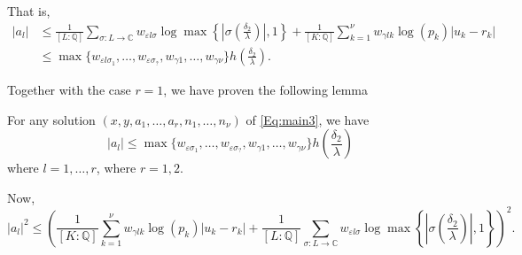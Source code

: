  That is, 
\begin{align*}
|a_l|	& \leq \frac{1}{[L:\mathbb{Q}]}\sum_{\sigma :L \to \mathbb{C}} w_{\varepsilon l \sigma}\log \max \left\{ \left|\sigma\left(\frac{\delta_2}{\lambda}\right)\right|, 1\right\} + \frac{1}{[K:\mathbb{Q}]}\sum_{k = 1}^{\nu} w_{\gamma l k}\log(p_k)|u_k - r_k|\\
	& \leq \max\{w_{\varepsilon l \sigma_1}, \dots, w_{\varepsilon \sigma_{?}}, w_{\gamma 1}, \dots, w_{\gamma \nu}\} h\left(\frac{\delta_2}{\lambda}\right).
\end{align*}

Together with the case $r = 1$, we have proven the following lemma
\begin{lemma}\label{lem:mepsbound}
For any solution $(x,y,a_1, \dots, a_r, n_1, \dots, n_{\nu})$ of \eqref{Eq:main3}, we have
\[|a_l| \leq \max\{w_{\varepsilon \sigma_1}, \dots, w_{\varepsilon \sigma_{?}}, w_{\gamma 1}, \dots, w_{\gamma \nu}\} h\left(\frac{\delta_2}{\lambda}\right)\]
where $l = 1, \dots, r$, where $r = 1, 2$. 
\end{lemma}

Now, 
\begin{equation}\label{def:bepsbound}
|a_l|^2 \leq \left( \frac{1}{[K:\mathbb{Q}]}\sum_{k = 1}^{\nu} w_{\gamma l k}\log(p_k)|u_k - r_k| + \frac{1}{[L:\mathbb{Q}]}\sum_{\sigma :L \to \mathbb{C}} w_{\varepsilon l \sigma}\log \max \left\{ \left|\sigma\left(\frac{\delta_2}{\lambda}\right)\right|, 1\right\} \right)^2.
\end{equation}


